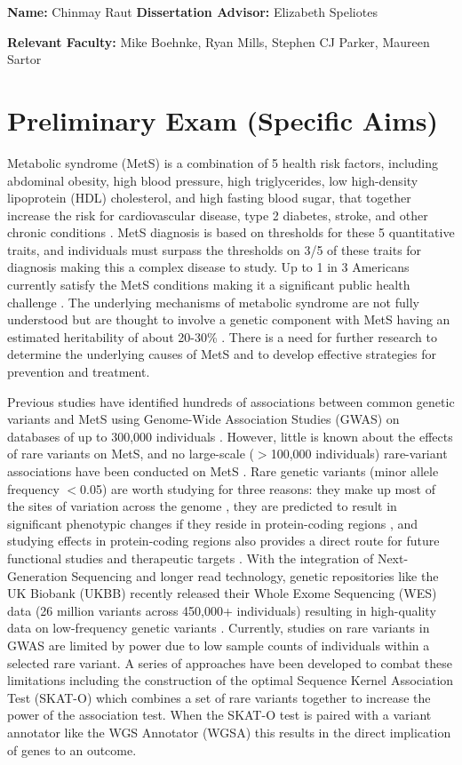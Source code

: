 \documentclass[11pt]{article}
\begin{document}
\noindent
\textbf{Name:} Chinmay Raut \textbf{Dissertation Advisor:} Elizabeth Speliotes

\noindent
\textbf{Relevant Faculty: } Mike Boehnke, Ryan Mills, Stephen CJ Parker, Maureen Sartor

\section*{Preliminary Exam (Specific Aims)}

Metabolic syndrome (MetS) is a combination of 5 health risk factors, including abdominal obesity, high blood pressure, high triglycerides, low high-density lipoprotein (HDL) cholesterol, and high fasting blood sugar, that together increase the risk for cardiovascular disease, type 2 diabetes, stroke, and other chronic conditions \cite{pmid29480368}. MetS diagnosis is based on thresholds for these 5 quantitative traits, and individuals must surpass the thresholds on 3/5 of these traits for diagnosis making this a complex disease to study. Up to 1 in 3 Americans currently satisfy the MetS conditions making it a significant public health challenge \cite{pmid29480368}. The underlying mechanisms of metabolic syndrome are not fully understood but are thought to involve a genetic component with MetS having an estimated heritability of about 20-30\% \cite{Graziano2019}. There is a need for further research to determine the underlying causes of MetS and to develop effective strategies for prevention and treatment.

Previous studies have identified hundreds of associations between common genetic variants and MetS using Genome-Wide Association Studies (GWAS) on databases of up to 300,000 individuals \cite{pmid31589552}. However, little is known about the effects of rare variants on MetS, and no large-scale ($>$100,000 individuals) rare-variant associations have been conducted on MetS \cite{Lee2018}. Rare genetic variants (minor allele frequency $<$0.05) are worth studying for three reasons: they make up most of the sites of variation across the genome \cite{pmid34662886}, they are predicted to result in significant phenotypic changes if they reside in protein-coding regions \cite{pmid34662886}, and studying effects in protein-coding regions also provides a direct route for future functional studies and therapeutic targets \cite{doi:10.1056/NEJMoa2117872}. With the integration of Next-Generation Sequencing and longer read technology, genetic repositories like the UK Biobank (UKBB) recently released their Whole Exome Sequencing  (WES) data (26 million variants across 450,000+ individuals) resulting in high-quality data on low-frequency genetic variants \cite{pmid34662886}. Currently, studies on rare variants in GWAS are limited by power due to low sample counts of individuals within a selected rare variant. A series of approaches have been developed to combat these limitations including the construction of the optimal Sequence Kernel Association Test (SKAT-O) \cite{pmid22863193} which combines a set of rare variants together to increase the power of the association test. When the SKAT-O test is paired with a variant annotator like the WGS Annotator (WGSA) \cite{pmid26395054} this results in the direct implication of genes to an outcome.
\end{document}
